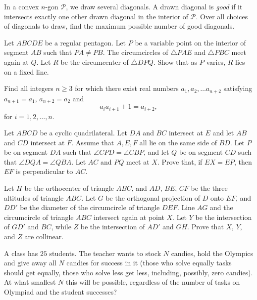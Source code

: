 \documentclass[11pt]{scrartcl}
\begin{document}
\begin{problem}[193788212098506]
  In a convex $n$-gon $\mathcal P$, we draw several diagonals.
  A drawn diagonal is \emph{good} if it intersects
  exactly one other drawn diagonal in the interior of $\mathcal P$.
  Over all choices of diagonals to draw,
  find the maximum possible number of good diagonals.
\end{problem}
\begin{problem}[6020628633767269011]
Let \(ABCDE\) be a regular pentagon. Let \(P\) be a variable point on the interior of segment \(AB\) such that \(PA\ne PB\). The circumcircles of \(\triangle PAE\) and \(\triangle PBC\) meet again at \(Q\). Let \(R\) be the circumcenter of \(\triangle DPQ\). Show that as \(P\) varies, \(R\) lies on a fixed line.
\end{problem}
\begin{problem}[574223786384294]
Find all integers $n \geq 3$ for which there exist real numbers $a_1, a_2, \dots a_{n + 2}$ satisfying $a_{n + 1} = a_1$, $a_{n + 2} = a_2$ and
$$a_ia_{i + 1} + 1 = a_{i + 2},$$for $i = 1, 2, \dots, n$.
\end{problem}
\begin{problem}[3353450172272500341]
Let $ABCD$ be a cyclic quadrilateral. Let $DA$ and $BC$ intersect at $E$ and let $AB$ and $CD$
intersect at $F$. Assume that $A, E, F$ all lie on the same side of $BD$. Let $P$ be on segment $DA$
such that $\angle CPD = \angle CBP$, and let $Q$ be on segment $CD$ such that $\angle DQA = \angle QBA$. Let $AC$ and $PQ$ meet at $X$. Prove that, if $EX = EP$, then $EF$ is perpendicular to $AC$.
\end{problem}
\begin{problem}[1872712387771032593]
Let $H$ be the orthocenter of triangle $ABC$, and $AD$, $BE$, $CF$ be the three altitudes of triangle $ABC$. Let $G$ be the orthogonal projection of $D$ onto $EF$, and $DD'$ be the diameter of the circumcircle of triangle $DEF$. Line $AG$ and the circumcircle of triangle $ABC$ intersect again at point $X$. Let $Y$ be the intersection of $GD'$ and $BC$, while $Z$ be the intersection of $AD'$ and $GH$. Prove that $X$, $Y$, and $Z$ are collinear.
\end{problem}
\begin{problem}[458902414604417]
	A class has $25$ students. The teacher wants to stock $N$ candies, hold the Olympics and give away all $N$ candies for success in it (those who solve equally tasks should get equally, those who solve less get less, including, possibly, zero candies). At what smallest $N$ this will be possible, regardless of the number of tasks on Olympiad and the student successes?
\end{problem}
\end{document}
